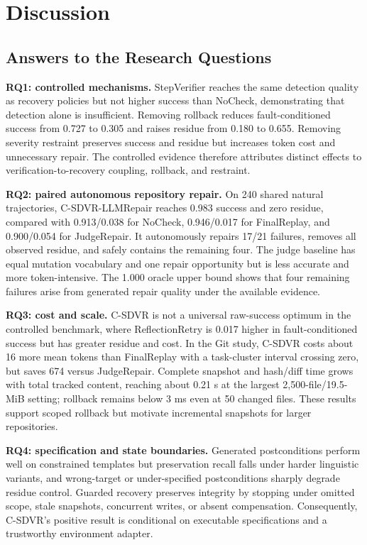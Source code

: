 \documentclass[pdflatex,sn-apa]{sn-jnl}
\begin{document}
\section{Discussion}

\subsection{Answers to the Research Questions}

\textbf{RQ1: controlled mechanisms.} StepVerifier reaches the same detection quality as recovery policies but not higher success than NoCheck, demonstrating that detection alone is insufficient. Removing rollback reduces fault-conditioned success from 0.727 to 0.305 and raises residue from 0.180 to 0.655. Removing severity restraint preserves success and residue but increases token cost and unnecessary repair. The controlled evidence therefore attributes distinct effects to verification-to-recovery coupling, rollback, and restraint.

\textbf{RQ2: paired autonomous repository repair.} On 240 shared natural trajectories, C-SDVR-LLMRepair reaches 0.983 success and zero residue, compared with 0.913/0.038 for NoCheck, 0.946/0.017 for FinalReplay, and 0.900/0.054 for JudgeRepair. It autonomously repairs 17/21 failures, removes all observed residue, and safely contains the remaining four. The judge baseline has equal mutation vocabulary and one repair opportunity but is less accurate and more token-intensive. The 1.000 oracle upper bound shows that four remaining failures arise from generated repair quality under the available evidence.

\textbf{RQ3: cost and scale.} C-SDVR is not a universal raw-success optimum in the controlled benchmark, where ReflectionRetry is 0.017 higher in fault-conditioned success but has greater residue and cost. In the Git study, C-SDVR costs about 16 more mean tokens than FinalReplay with a task-cluster interval crossing zero, but saves 674 versus JudgeRepair. Complete snapshot and hash/diff time grows with total tracked content, reaching about 0.21 s at the largest 2,500-file/19.5-MiB setting; rollback remains below 3 ms even at 50 changed files. These results support scoped rollback but motivate incremental snapshots for larger repositories.

\textbf{RQ4: specification and state boundaries.} Generated postconditions perform well on constrained templates but preservation recall falls under harder linguistic variants, and wrong-target or under-specified postconditions sharply degrade residue control. Guarded recovery preserves integrity by stopping under omitted scope, stale snapshots, concurrent writes, or absent compensation. Consequently, C-SDVR's positive result is conditional on executable specifications and a trustworthy environment adapter.
\end{document}
